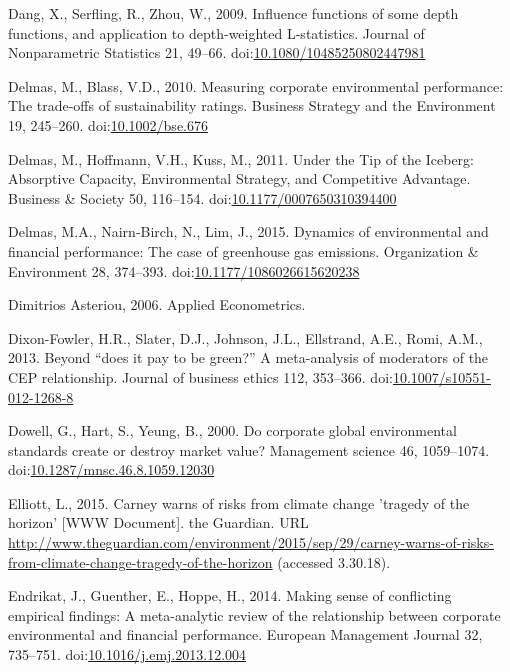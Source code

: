 \documentclass[12pt,]{article}
\begin{document}
\hypertarget{ref-Dang2009}{}
Dang, X., Serfling, R., Zhou, W., 2009. Influence functions of some
depth functions, and application to depth-weighted L-statistics. Journal
of Nonparametric Statistics 21, 49--66.
doi:\href{https://doi.org/10.1080/10485250802447981}{10.1080/10485250802447981}

\hypertarget{ref-Delmas2010}{}
Delmas, M., Blass, V.D., 2010. Measuring corporate environmental
performance: The trade-offs of sustainability ratings. Business Strategy
and the Environment 19, 245--260.
doi:\href{https://doi.org/10.1002/bse.676}{10.1002/bse.676}

\hypertarget{ref-Delmas2011a}{}
Delmas, M., Hoffmann, V.H., Kuss, M., 2011. Under the Tip of the
Iceberg: Absorptive Capacity, Environmental Strategy, and Competitive
Advantage. Business \& Society 50, 116--154.
doi:\href{https://doi.org/10.1177/0007650310394400}{10.1177/0007650310394400}

\hypertarget{ref-Delmas2015}{}
Delmas, M.A., Nairn-Birch, N., Lim, J., 2015. Dynamics of environmental
and financial performance: The case of greenhouse gas emissions.
Organization \& Environment 28, 374--393.
doi:\href{https://doi.org/10.1177/1086026615620238}{10.1177/1086026615620238}

\hypertarget{ref-DimitriosAsteriou2006}{}
Dimitrios Asteriou, 2006. Applied Econometrics.

\hypertarget{ref-Dixon-Fowler2013}{}
Dixon-Fowler, H.R., Slater, D.J., Johnson, J.L., Ellstrand, A.E., Romi,
A.M., 2013. Beyond ``does it pay to be green?'' A meta-analysis of
moderators of the CEP relationship. Journal of business ethics 112,
353--366.
doi:\href{https://doi.org/10.1007/s10551-012-1268-8}{10.1007/s10551-012-1268-8}

\hypertarget{ref-Dowell2000}{}
Dowell, G., Hart, S., Yeung, B., 2000. Do corporate global environmental
standards create or destroy market value? Management science 46,
1059--1074.
doi:\href{https://doi.org/10.1287/mnsc.46.8.1059.12030}{10.1287/mnsc.46.8.1059.12030}

\hypertarget{ref-Elliott2015}{}
Elliott, L., 2015. Carney warns of risks from climate change 'tragedy of
the horizon' {[}WWW Document{]}. the Guardian. URL
\url{http://www.theguardian.com/environment/2015/sep/29/carney-warns-of-risks-from-climate-change-tragedy-of-the-horizon}
(accessed 3.30.18).

\hypertarget{ref-EndrikatMakingsenseconflicting2014}{}
Endrikat, J., Guenther, E., Hoppe, H., 2014. Making sense of conflicting
empirical findings: A meta-analytic review of the relationship between
corporate environmental and financial performance. European Management
Journal 32, 735--751.
doi:\href{https://doi.org/10.1016/j.emj.2013.12.004}{10.1016/j.emj.2013.12.004}
\end{document}
